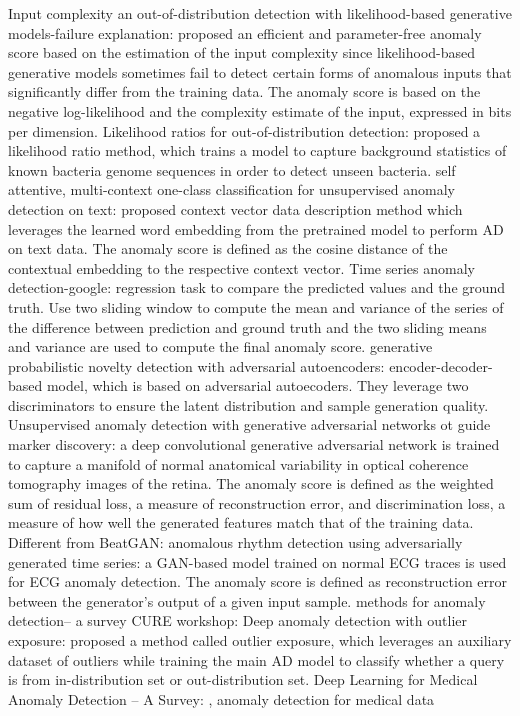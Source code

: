 \documentclass{article}
\begin{document}
	\cite{serra2019input} Input complexity an out-of-distribution detection with likelihood-based generative models-failure explanation: proposed an efficient and parameter-free anomaly score based on the estimation of the input complexity since likelihood-based generative models sometimes fail to detect certain forms of anomalous inputs that significantly differ from the training data. The anomaly score is based on the negative log-likelihood and the complexity estimate of the input, expressed in bits per dimension. 
	\cite{ren2019likelihood} %
	Likelihood ratios for out-of-distribution detection: proposed a likelihood ratio method, which trains a model to capture background statistics of known bacteria genome sequences in order to detect unseen bacteria. 
	\cite{ruff2019self} self attentive, multi-context one-class classification for unsupervised anomaly detection on text: proposed context vector data description method which leverages the learned word embedding from the pretrained model to perform AD on text data. The anomaly score is defined as the cosine distance of the contextual embedding to the respective context vector.
	\cite{shipmon2017time} Time series anomaly detection-google: regression task to compare the predicted values and the ground truth. Use two sliding window to compute the mean and variance of the series of the difference between prediction and ground truth and the two sliding means and variance are used to compute the final anomaly score. 
	\cite{pidhorskyi2018generative} generative probabilistic novelty detection with adversarial autoencoders: encoder-decoder-based model, which is based on adversarial autoecoders. They leverage two discriminators to ensure the latent distribution and sample generation quality. 
	\cite{schlegl2017unsupervised} Unsupervised anomaly detection with generative adversarial networks ot guide marker discovery: a deep convolutional generative adversarial network is trained to capture a manifold of normal anatomical variability in optical coherence tomography images of the retina. The anomaly score is defined as the weighted sum of residual loss, a measure of reconstruction error, and discrimination loss, a measure of how well the generated features match that of the training data. Different from \cite{schlegl2017unsupervised}
	\cite{zhou2019beatgan} BeatGAN: anomalous rhythm detection using adversarially generated time series: a GAN-based model trained on normal ECG traces is used for ECG anomaly detection. The anomaly score is defined as reconstruction error between the generator's output of a given input sample.
	\cite{kalinichenko2014methods} methods for anomaly detection-- a survey CURE workshop:	
	\cite{hendrycks2018deep} Deep anomaly detection with outlier exposure: proposed a method called outlier exposure, which leverages an auxiliary dataset of outliers while training the main AD model to classify whether a query is from in-distribution set or out-distribution set.
	\cite{2020Deep} Deep Learning for Medical Anomaly Detection -- A Survey: , 
	\cite{Salem2013SensorFA} anomaly detection for medical data 
	
\end{document}
